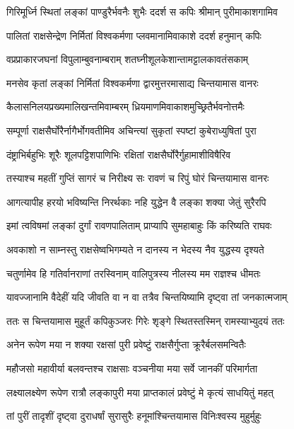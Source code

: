 \twolineshloka
{गिरिमूर्ध्नि स्थितां लङ्कां पाण्डुरैर्भवनैः शुभैः}
{ददर्श स कपिः श्रीमान् पुरीमाकाशगामिव} %

\twolineshloka
{पालितां राक्षसेन्द्रेण निर्मितां विश्वकर्मणा}
{प्लवमानामिवाकाशे ददर्श हनुमान् कपिः} %

\twolineshloka
{वप्रप्राकारजघनां विपुलाम्बुवनाम्बराम्}
{शतघ्नीशूलकेशान्तामट्टालकावतंसकाम्} %

\twolineshloka
{मनसेव कृतां लङ्कां निर्मितां विश्वकर्मणा}
{द्वारमुत्तरमासाद्य चिन्तयामास वानरः} %

\twolineshloka
{कैलासनिलयप्रख्यमालिखन्तमिवाम्बरम्}
{ध्रियमाणमिवाकाशमुच्छ्रितैर्भवनोत्तमैः} %

\twolineshloka
{सम्पूर्णा राक्षसैर्घोरैर्नागैर्भोगवतीमिव}
{अचिन्त्यां सुकृतां स्पष्टां कुबेराध्युषितां पुरा} %

\twolineshloka
{दंष्ट्राभिर्बहुभिः शूरैः शूलपट्टिशपाणिभिः}
{रक्षितां राक्षसैर्घोरैर्गुहामाशीविषैरिव} %

\twolineshloka
{तस्याश्च महतीं गुप्तिं सागरं च निरीक्ष्य सः}
{रावणं च रिपुं घोरं चिन्तयामास वानरः} %

\twolineshloka
{आगत्यापीह हरयो भविष्यन्ति निरर्थकाः}
{नहि युद्धेन वै लङ्का शक्या जेतुं सुरैरपि} %

\twolineshloka
{इमां त्वविषमां लङ्कां दुर्गां रावणपालिताम्}
{प्राप्यापि सुमहाबाहुः किं करिष्यति राघवः} %

\twolineshloka
{अवकाशो न साम्नस्तु राक्षसेष्वभिगम्यते}
{न दानस्य न भेदस्य नैव युद्धस्य दृश्यते} %

\twolineshloka
{चतुर्णामेव हि गतिर्वानराणां तरस्विनाम्}
{वालिपुत्रस्य नीलस्य मम राज्ञश्च धीमतः} %

\twolineshloka
{यावज्जानामि वैदेहीं यदि जीवति वा न वा}
{तत्रैव चिन्तयिष्यामि दृष्ट्वा तां जनकात्मजाम्} %

\twolineshloka
{ततः स चिन्तयामास मुहूर्तं कपिकुञ्जरः}
{गिरेः शृङ्गे स्थितस्तस्मिन् रामस्याभ्युदयं ततः} %

\twolineshloka
{अनेन रूपेण मया न शक्या रक्षसां पुरी}
{प्रवेष्टुं राक्षसैर्गुप्ता क्रूरैर्बलसमन्वितैः} %

\twolineshloka
{महौजसो महावीर्या बलवन्तश्च राक्षसाः}
{वञ्चनीया मया सर्वे जानकीं परिमार्गता} %

\twolineshloka
{लक्ष्यालक्ष्येण रूपेण रात्रौ लङ्कापुरी मया}
{प्राप्तकालं प्रवेष्टुं मे कृत्यं साधयितुं महत्} %

\twolineshloka
{तां पुरीं तादृशीं दृष्ट्वा दुराधर्षां सुरासुरैः}
{हनूमांश्चिन्तयामास विनिःश्वस्य मुहुर्मुहुः} %

